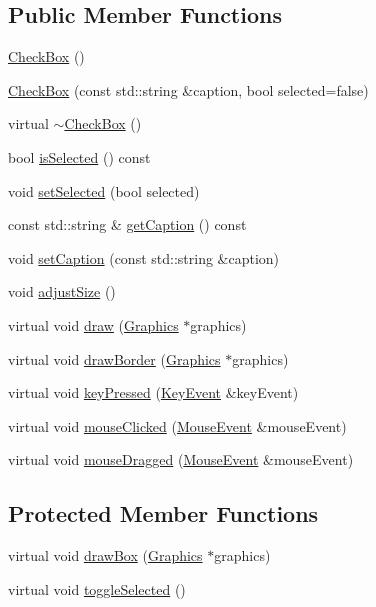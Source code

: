 \subsection*{Public Member Functions}
\begin{DoxyCompactItemize}
\item 
\hyperlink{classgcn_1_1CheckBox_a0e81d7b6fd1e6b0d196c8d800a8e2610}{Check\+Box} ()
\item 
\hyperlink{classgcn_1_1CheckBox_aab17607081d115e303b847b0e57338ec}{Check\+Box} (const std\+::string \&caption, bool selected=false)
\item 
virtual \hyperlink{classgcn_1_1CheckBox_aec8d239efd70e47dcb4fdf7684d747e3}{$\sim$\+Check\+Box} ()
\item 
bool \hyperlink{classgcn_1_1CheckBox_aa50cd949abb713529eb8fa60d85ead45}{is\+Selected} () const 
\item 
void \hyperlink{classgcn_1_1CheckBox_afc33cf5fe07bd1c121f76ecc2a6f0729}{set\+Selected} (bool selected)
\item 
const std\+::string \& \hyperlink{classgcn_1_1CheckBox_ae8fa88932da62ef67d0d4f6b39bbaf15}{get\+Caption} () const 
\item 
void \hyperlink{classgcn_1_1CheckBox_a155f63ad8ffcf2f8200c3ffef274247d}{set\+Caption} (const std\+::string \&caption)
\item 
void \hyperlink{classgcn_1_1CheckBox_a18dd39feee57e6bfcef69fc9f5b00d08}{adjust\+Size} ()
\item 
virtual void \hyperlink{classgcn_1_1CheckBox_acd76dee289dcd7cc07ade85ce74c7d7c}{draw} (\hyperlink{classgcn_1_1Graphics}{Graphics} $\ast$graphics)
\item 
virtual void \hyperlink{classgcn_1_1CheckBox_a385eb0b9601f128646dc28b0e34c0293}{draw\+Border} (\hyperlink{classgcn_1_1Graphics}{Graphics} $\ast$graphics)
\item 
virtual void \hyperlink{classgcn_1_1CheckBox_a40a70ca664f54dd568b3522e6fb6e7ce}{key\+Pressed} (\hyperlink{classgcn_1_1KeyEvent}{Key\+Event} \&key\+Event)
\item 
virtual void \hyperlink{classgcn_1_1CheckBox_a968db12a9f01c70979ca06a179e8d565}{mouse\+Clicked} (\hyperlink{classgcn_1_1MouseEvent}{Mouse\+Event} \&mouse\+Event)
\item 
virtual void \hyperlink{classgcn_1_1CheckBox_adedbb4f9840c41a9e6943d2757986dff}{mouse\+Dragged} (\hyperlink{classgcn_1_1MouseEvent}{Mouse\+Event} \&mouse\+Event)
\end{DoxyCompactItemize}
\subsection*{Protected Member Functions}
\begin{DoxyCompactItemize}
\item 
virtual void \hyperlink{classgcn_1_1CheckBox_ab2aad0c0ee5a68d446aeb582143fac01}{draw\+Box} (\hyperlink{classgcn_1_1Graphics}{Graphics} $\ast$graphics)
\item 
virtual void \hyperlink{classgcn_1_1CheckBox_a65e7e1e0c924a2dc249131f7961aaeba}{toggle\+Selected} ()
\end{DoxyCompactItemize}
